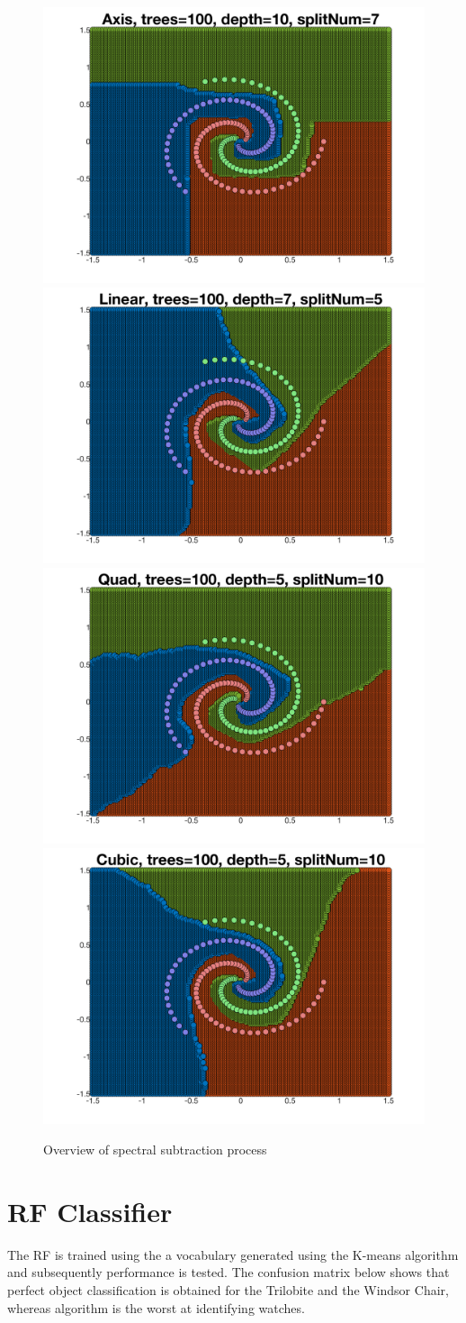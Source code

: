 \documentclass[a4paper,pra,twocolumn,10pt,aps,longbibliography,nobalancelastpage]{revtex4-1}
\begin{document}
\begin{figure}[H]
	\centering
    \includegraphics[width=0.40\columnwidth]{axis}
	\includegraphics[width=0.40\columnwidth]{linear}
    \includegraphics[width=0.40\columnwidth]{quad}
    \includegraphics[width=0.40\columnwidth]{cubic}
    \caption{Overview of spectral subtraction process}
\end{figure}

\section{RF Classifier}

The RF is trained using the a vocabulary generated using the K-means algorithm and subsequently performance is tested. The confusion matrix below shows that perfect object classification is obtained for the Trilobite and the Windsor Chair, whereas algorithm is the worst at identifying watches.
\end{document}
